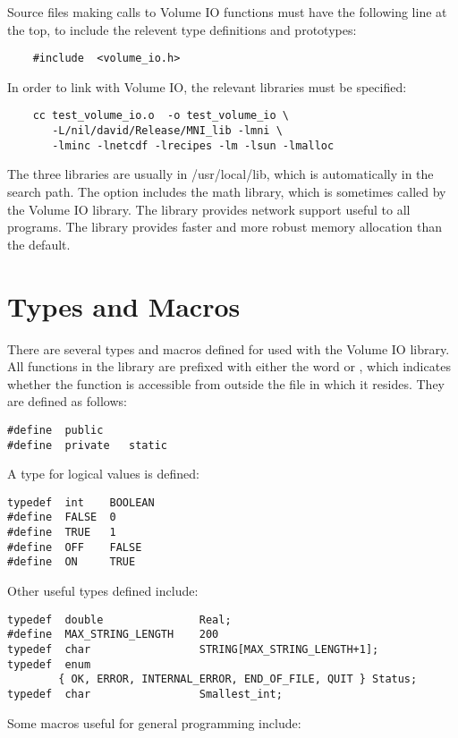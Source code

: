 Source files making calls to Volume IO functions must have the
following line at the top, to include the relevent type definitions and
prototypes:
\begin{verbatim}
    #include  <volume_io.h>
\end{verbatim}

In order to link with Volume IO, the relevant libraries must be
specified:
\begin{verbatim}
    cc test_volume_io.o  -o test_volume_io \
       -L/nil/david/Release/MNI_lib -lmni \
       -lminc -lnetcdf -lrecipes -lm -lsun -lmalloc
\end{verbatim}
The three libraries are usually in /usr/local/lib, which is
automatically in the search path.  The  option includes the
math library, which is sometimes called by the Volume IO library.  The
\name{-lsun} library provides network support useful to all programs.
The \name{-lmalloc} library provides faster and more robust memory
allocation than the default.

\section{Types and Macros}

There are several types and macros defined for used with the Volume IO
library.  All functions in the library are prefixed with either the
word \name{public} or \name{private}, which indicates whether the
function is accessible from outside the file in which it resides.
They are defined as follows:
\begin{verbatim}
#define  public
#define  private   static
\end{verbatim}

A type for logical values is defined:
\begin{verbatim}
typedef  int    BOOLEAN
#define  FALSE  0
#define  TRUE   1
#define  OFF    FALSE
#define  ON     TRUE
\end{verbatim}

Other useful types defined include:
\begin{verbatim}
typedef  double               Real;
#define  MAX_STRING_LENGTH    200
typedef  char                 STRING[MAX_STRING_LENGTH+1];
typedef  enum 
        { OK, ERROR, INTERNAL_ERROR, END_OF_FILE, QUIT } Status;
typedef  char                 Smallest_int;
\end{verbatim}

Some macros useful for general programming include:

